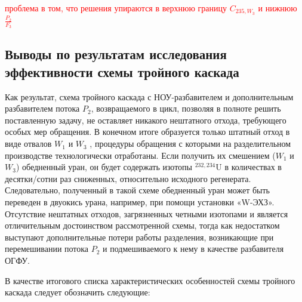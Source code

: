 \textcolor{red}{проблема в том, что решения упираются в верхнюю границу $C_{235,W_{3}}$ и нижнюю $\frac{P_{2}}{F_3}$}


\subsection{Выводы по результатам исследования эффективности схемы тройного каскада}

Как результат, схема тройного каскада с НОУ-разбавителем и дополнительным разбавителем потока $P_2$, возвращаемого в цикл, позволяя в полноте решить поставленную задачу, не оставляет никакого нештатного отхода, требующего особых мер обращения. В конечном итоге образуется только штатный отход в виде отвалов $W_1$ и $W_3$ , процедуры обращения с которыми на разделительном производстве технологически отработаны. Если получить их смешением ($W_1$ и $W_3$) обедненный уран, он будет содержать изотопы $^{232,234}$U в количествах в десятки/сотни раз сниженных, относительно исходного регенерата. Следовательно, полученный в такой схеме обедненный уран может быть переведен в двуокись урана, например, при помощи установки «W-ЭХЗ». Отсутствие нештатных отходов, загрязненных четными изотопами и является отличительным достоинством рассмотренной схемы, тогда как недостатком выступают дополнительные потери работы разделения, возникающие при перемешивании потока $P_2$ и подмешиваемого к нему в качестве разбавителя ОГФУ.


В качестве итогового списка характеристических особенностей схемы тройного каскада следует обозначить следующие:

